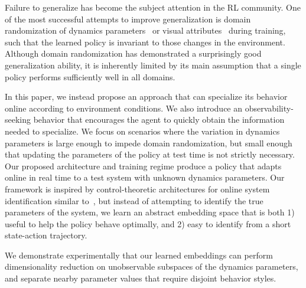 \documentclass{article}
\newcommand{\TODO}[1]{\textcolor{red}{\textbf{TODO: #1}}}
\begin{document}
Failure to generalize has become the subject attention in the RL community.
One of the most successful attempts to improve generalization is domain randomization of dynamics parameters~\citep{antonova-pivoting-corr17, zhu-RL-IL-diverse}
or visual attributes~\citep{sadeghi-cad2rl-rss17,tobin-domainrand-arxiv17,james-domain-xfer} during training, such that the learned policy is invariant to those changes in the environment.
Although domain randomization has demonstrated a surprisingly good generalization ability,
it is inherently limited by its main assumption that a single policy performs sufficiently well in all domains.


In this paper, we instead propose an approach that can specialize its behavior online according to environment conditions. 
We also introduce an observability-seeking behavior that encourages the agent to quickly obtain the information needed to specialize. 
We focus on scenarios where the variation in dynamics parameters
is large enough to impede domain randomization,
but small enough that updating the parameters of the policy at test time is not strictly necessary.
Our proposed architecture and training regime produce a policy
that adapts online in real time to a test system with unknown dynamics parameters.
Our framework is inspired by control-theoretic architectures for online system identification
similar to~\citet{yu-up-osi-rss17},
but instead of attempting to identify the true parameters of the system,
we learn an abstract embedding space that is both
1) useful to help the policy behave optimally, and
2) easy to identify from a short state-action trajectory.

We demonstrate experimentally that our learned embeddings can perform dimensionality reduction on unobservable subspaces of the dynamics parameters,
and separate nearby parameter values that require disjoint behavior styles.
\end{document}
